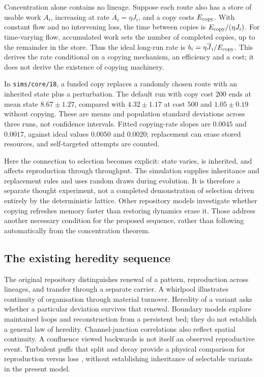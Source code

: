 Concentration alone contains no lineage. Suppose each route also has a store
of usable work $A_i$, increasing at rate $\dot A_i=\eta J_i$, and a copy costs
$E_{\rm copy}$. With constant flow and no intervening loss, the time between
copies is $E_{\rm copy}/(\eta J_i)$. For time-varying flow, accumulated work
sets the number of completed copies, up to the remainder in the store. Thus
the ideal long-run rate is $b_i=\eta\overline J_i/E_{\rm copy}$.
This derives the rate conditional on a copying mechanism, an efficiency and a
cost; it does not derive the existence of copying machinery.

In \texttt{sims/core/18}, a funded copy replaces a randomly chosen route with
an inherited state plus a perturbation. The default run with copy cost $200$
ends at mean state $8.67\pm1.27$, compared with $4.32\pm1.17$ at cost $500$
and $1.05\pm0.19$ without copying. These are means and population standard
deviations across three runs, not confidence intervals. Fitted copying-rate
slopes are $0.0045$ and $0.0017$, against ideal values $0.0050$ and $0.0020$;
replacement can erase stored resources, and self-targeted attempts are counted.

Here the connection to selection becomes explicit: state varies, is inherited,
and affects reproduction through throughput. The simulation supplies
inheritance and replacement rules and uses random draws during evolution.
It is therefore a separate thought experiment, not a completed demonstration
of selection driven entirely by the deterministic lattice. Other repository
models investigate whether copying refreshes memory faster than restoring
dynamics erase it. Those address another necessary condition for the proposed
sequence, rather than following automatically from the concentration theorem.

\subsection{The existing heredity sequence}

The original repository distinguishes renewal of a pattern, reproduction across
lineages, and transfer through a separate carrier. A whirlpool illustrates
continuity of organisation through material turnover. Heredity of a variant asks
whether a particular deviation survives that renewal. Boundary models explore
maintained loops and reconstruction from a persistent bed; they do not establish
a general law of heredity. Channel-junction correlations also reflect spatial
continuity. A confluence viewed backwards is not itself an observed reproductive
event. Turbulent puffs that split and decay provide a physical comparison for
reproduction versus loss \cite{puffs}, without establishing inheritance of
selectable variants in the present model.

